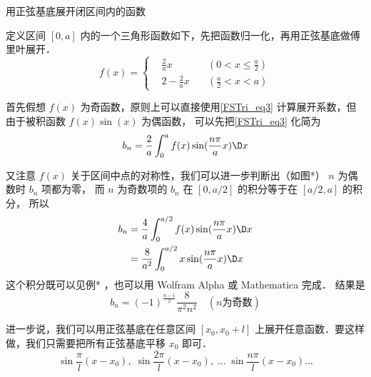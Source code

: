 \begin{exam}{用正弦基底展开闭区间内的函数}

定义区间 $[0,a]$ 内的一个三角形函数如下，先把函数归一化，再用正弦基底做傅里叶展开．
\begin{equation}
f(x) = 
\left\{\begin{aligned}
&\frac 2a x &\quad (0 < x \le \frac a2)\\
&2 -\frac 2a x &\quad (\frac a2 < x < a)
\end{aligned}\right.
\end{equation}

首先假想 $f(x)$ 为奇函数，原则上可以直接使用\autoref{FSTri_eq3} 计算展开系数，但由于被积函数 $f(x)\sin(x)$ 为偶函数， 可以先把\autoref{FSTri_eq3} 化简为%
\begin{equation}
{b_n} = \frac{2}{a}\int_{0}^a {f( x )\sin (\frac{{n\pi }}{a}x)\D x}
\end{equation}


又注意 $f(x)$ 关于区间中点的对称性，我们可以进一步判断出（如图*） $n$ 为偶数时 $b_n$ 项都为零， 而 $n$ 为奇数项的 $b_n$ 在 $[0,a/2]$ 的积分等于在 $[a/2,a]$ 的积分， 所以
\begin{equation}\begin{aligned}
{b_n} &= \frac{4}{a}\int_{0}^{a/2} {f( x )\sin (\frac{{n\pi }}{a}x)\D x}\\
&= \frac{8}{a^2} \int_{0}^{a/2} {x\sin (\frac{{n\pi }}{a}x)\D x}
\end{aligned}\end{equation}
这个积分既可以见例*%
，也可以用 Wolfram Alpha 或 Mathematica 完成．%
结果是
\begin{equation}
b_n = (-1)^{\frac{n-1}{2}} \frac{8}{\pi^2 n^2} \quad (n\text{为奇数})
\end{equation}

\end{exam}

进一步说，我们可以用正弦基底在任意区间 $[x_0,x_0+l]$ 上展开任意函数．要这样做，我们只需要把所有正弦基底平移 $x_0$ 即可．
\begin{equation}
\sin\frac{\pi}{l} (x-x_0),\;   \sin\frac{2\pi}{l} (x-x_0),\;    \dots\;\sin\frac{n\pi}{l} (x-x_0) \dots
\end{equation}


